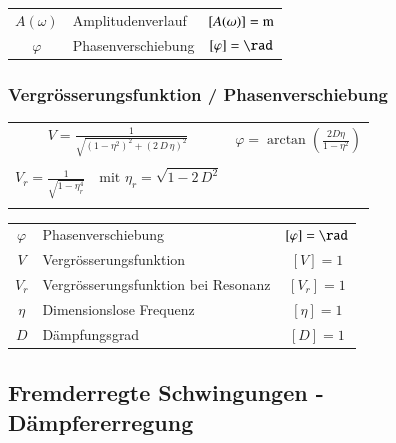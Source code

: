 \begin{tabular}{c l c}
$A(\omega)$ & Amplitudenverlauf & $[A(\omega)] = \mathrm{m}$ \\
$\varphi$ & Phasenverschiebung & $[\varphi] = \rad$
\end{tabular}




\subsubsection{Vergrösserungsfunktion / Phasenverschiebung}

\begin{tabular}{c c}
$ \boxed{ V = \frac{1}{\sqrt{(1- \eta^2)^2 + (2 \, D \, \eta)^2} } } $ & $ \boxed{ \varphi = \arctan \left( \frac{2 D \eta}{1 - \eta^2}  \right) } $ \\
\\
$ \boxed{ V_r = \frac{1}{\sqrt{ 1 - \eta_r^4} } \quad \text{mit } \eta_r = \sqrt{1 - 2 \, D^2}  } $ \\
\\
\end{tabular}


\begin{tabular}{c l c}
$\varphi$ & Phasenverschiebung & $[ \varphi] = \rad$ \\
$V$ & Vergrösserungsfunktion & $[V] = 1$ \\
$V_r$ & Vergrösserungsfunktion bei Resonanz & $[V_r] = 1$ \\
$\eta$ & Dimensionslose Frequenz & $[\eta] = 1$  \\
$D$ & Dämpfungsgrad & $[D] = 1$ 
\end{tabular}




\subsection{Fremderregte Schwingungen - Dämpfererregung}

